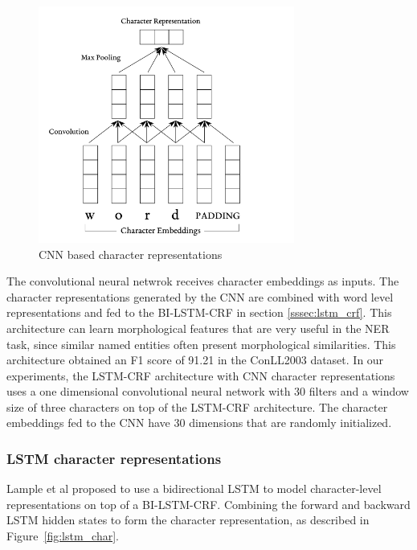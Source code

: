 \documentclass{nle}
\begin{document}
\begin{figure}[h]
  \centering
	  \includegraphics[width=0.75\textwidth]{pics/cnn}
  \caption{CNN based character representations}
  \label{fig:cnn}
\end{figure}

The convolutional neural netwrok receives character embeddings as inputs. The character 
representations generated by the CNN are combined with word level representations 
and fed to the BI-LSTM-CRF in section \ref{sssec:lstm_crf}.
This architecture can learn morphological features that are very
useful in the NER task, since similar named entities often present morphological similarities. 
This architecture obtained an F1 score of 91.21 in the ConLL2003 dataset. In our experiments, 
the LSTM-CRF architecture with CNN character representations uses a one dimensional convolutional 
neural network with 30 filters and a window size of three characters on top of the LSTM-CRF 
architecture. The character embeddings fed to the CNN have 30 dimensions that are randomly 
initialized.

\subsubsection{LSTM character representations}

Lample et al \cite{Lample2016} proposed to use a bidirectional LSTM to model character-level 
representations on top of a BI-LSTM-CRF. Combining the forward and backward LSTM hidden states 
to form the character representation, as described in Figure~\ref{fig:lstm_char}. 
\end{document}

